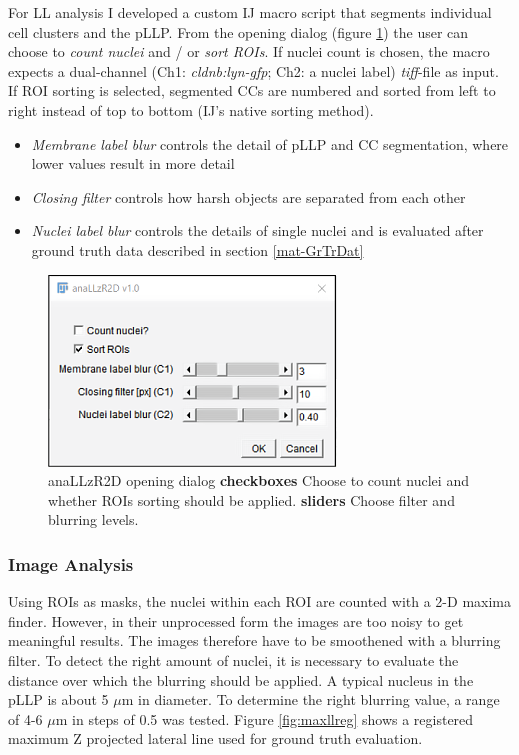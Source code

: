 \documentclass[11pt,singlespacinge,twoside]{reedthesis} %
\providecommand{\tightlist}{%
  \setlength{\itemsep}{0pt}\setlength{\parskip}{0pt}}
\theoremstyle{definition}
\theoremstyle{definition}
\theoremstyle{definition}
\theoremstyle{remark}
\begin{document}
For LL analysis I developed a custom IJ macro script that segments individual cell clusters and the pLLP. From the opening dialog (figure \ref{fig:anallzr2ddialog}) the user can choose to \emph{count nuclei} and / or \emph{sort ROIs}. If nuclei count is chosen, the macro expects a dual-channel (Ch1: \emph{cldnb:lyn-gfp}; Ch2: a nuclei label) \emph{tiff}-file as input. If ROI sorting is selected, segmented CCs are numbered and sorted from left to right instead of top to bottom (IJ's native sorting method).
\begin{itemize}
\tightlist
\item
  \emph{Membrane label blur} controls the detail of pLLP and CC segmentation, where lower values result in more detail
\item
  \emph{Closing filter} controls how harsh objects are separated from each other
\item
  \emph{Nuclei label blur} controls the details of single nuclei and is evaluated after ground truth data described in section \ref{mat-GrTrDat}
\end{itemize}

\begin{figure}[h]

{\centering \includegraphics[width=0.4\linewidth,]{figures/materials/macros/anallzr2D_macro} 

}

\caption[anaLLzR2D opening dialog]{anaLLzR2D opening dialog \textbf{checkboxes} Choose to count nuclei and whether ROIs sorting should be applied. \textbf{sliders} Choose filter and blurring levels.}\label{fig:anallzr2ddialog}
\end{figure}
\hypertarget{image-analysis}{%
\subsubsection{Image Analysis}\label{image-analysis}}

Using ROIs as masks, the nuclei within each ROI are counted with a 2-D maxima finder. However, in their unprocessed form the images are too noisy to get meaningful results. The images therefore have to be smoothened with a blurring filter. To detect the right amount of nuclei, it is necessary to evaluate the distance over which the blurring should be applied. A typical nucleus in the pLLP is about 5 \(\mu\)m in diameter. To determine the right blurring value, a range of 4-6 \(\mu\)m in steps of 0.5 was tested. Figure \ref{fig:maxllreg} shows a registered maximum Z projected lateral line used for ground truth evaluation.
\end{document}
